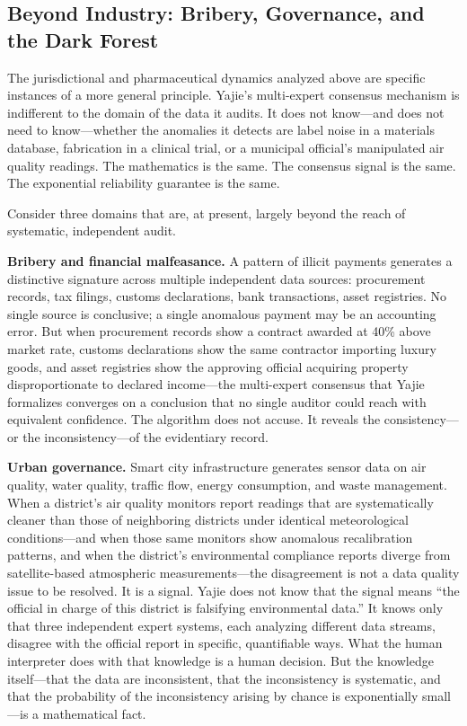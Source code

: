 \documentclass[12pt,a4paper]{ctexart}
\theoremstyle{definition}
\theoremstyle{remark}
\begin{document}
\subsection{Beyond Industry: Bribery, Governance, and the Dark Forest}

The jurisdictional and pharmaceutical dynamics analyzed above are specific instances of a more general principle. Yajie's multi-expert consensus mechanism is indifferent to the domain of the data it audits. It does not know—and does not need to know—whether the anomalies it detects are label noise in a materials database, fabrication in a clinical trial, or a municipal official's manipulated air quality readings. The mathematics is the same. The consensus signal is the same. The exponential reliability guarantee is the same.

Consider three domains that are, at present, largely beyond the reach of systematic, independent audit.

\textbf{Bribery and financial malfeasance.} A pattern of illicit payments generates a distinctive signature across multiple independent data sources: procurement records, tax filings, customs declarations, bank transactions, asset registries. No single source is conclusive; a single anomalous payment may be an accounting error. But when procurement records show a contract awarded at 40\% above market rate, customs declarations show the same contractor importing luxury goods, and asset registries show the approving official acquiring property disproportionate to declared income—the multi-expert consensus that Yajie formalizes converges on a conclusion that no single auditor could reach with equivalent confidence. The algorithm does not accuse. It reveals the consistency—or the inconsistency—of the evidentiary record.

\textbf{Urban governance.} Smart city infrastructure generates sensor data on air quality, water quality, traffic flow, energy consumption, and waste management. When a district's air quality monitors report readings that are systematically cleaner than those of neighboring districts under identical meteorological conditions—and when those same monitors show anomalous recalibration patterns, and when the district's environmental compliance reports diverge from satellite-based atmospheric measurements—the disagreement is not a data quality issue to be resolved. It is a signal. Yajie does not know that the signal means ``the official in charge of this district is falsifying environmental data.'' It knows only that three independent expert systems, each analyzing different data streams, disagree with the official report in specific, quantifiable ways. What the human interpreter does with that knowledge is a human decision. But the knowledge itself—that the data are inconsistent, that the inconsistency is systematic, and that the probability of the inconsistency arising by chance is exponentially small—is a mathematical fact.
\end{document}
